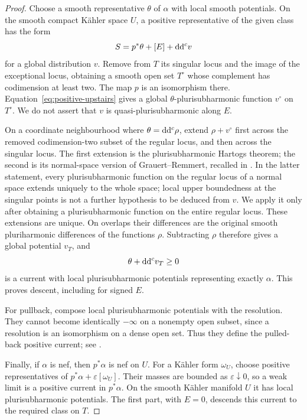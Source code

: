 \begin{proof}
Choose a smooth representative $\theta$ of $\alpha$ with local smooth
potentials.  On the smooth compact K\"ahler space $U$, a positive
representative of the given class has the form
\begin{equation}\label{eq:positive-upstairs}
 S=p^*\theta+[E]+\mathrm{d}\mathrm{d}^{c} v
\end{equation}
for a global distribution $v$.  Remove from $T$ its singular locus
and the image of the exceptional locus, obtaining a smooth open set
$T^\circ$ whose complement has codimension at least two.  The map
$p$ is an isomorphism there.  Equation~\eqref{eq:positive-upstairs}
gives a global $\theta$-plurisubharmonic function $v^\circ$ on
$T^\circ$.  We do not assert that $v$ is quasi-plurisubharmonic along
$E$.

On a coordinate neighbourhood where $\theta=\mathrm{d}\mathrm{d}^{c}\rho$, extend
$\rho+v^\circ$ first across the removed codimension-two subset of
the regular locus, and then across the singular locus.  The first
extension is the plurisubharmonic Hartogs theorem; the second is its
normal-space version of Grauert--Remmert, recalled in
\cite[Section~2.1, pp.~927--928]{CMM2017}. In the latter statement,
every plurisubharmonic function on the regular locus of a normal space
extends uniquely to the whole space; local upper boundedness at the
singular points is not a further hypothesis to be deduced from $v$.
We apply it only after obtaining a plurisubharmonic function on the
entire regular locus. These extensions are unique.
On overlaps their differences are the original smooth
pluriharmonic differences of the functions $\rho$.  Subtracting
$\rho$ therefore gives a global potential $v_T$, and
\[
 \theta+\mathrm{d}\mathrm{d}^{c} v_T\geq0
\]
is a current with local plurisubharmonic potentials representing
exactly $\alpha$.  This proves descent, including for signed $E$.

For pullback, compose local plurisubharmonic potentials with the
resolution.  They cannot become identically $-\infty$ on a nonempty
open subset, since a resolution is an isomorphism on a dense open
set.  Thus they define the pulled-back positive current; see
\cite[Section~2.1, p.~928]{CMM2017}.

Finally, if $\alpha$ is nef, then $p^*\alpha$ is nef on $U$.
For a K\"ahler form $\omega_U$, choose positive representatives of
$p^*\alpha+\varepsilon[\omega_U]$.  Their masses are bounded as
$\varepsilon\downarrow0$, so a weak limit is a positive current in
$p^*\alpha$.  On the smooth K\"ahler manifold $U$ it has local
plurisubharmonic potentials.  The first part, with $E=0$, descends
this current to the required class on $T$.
\end{proof}

